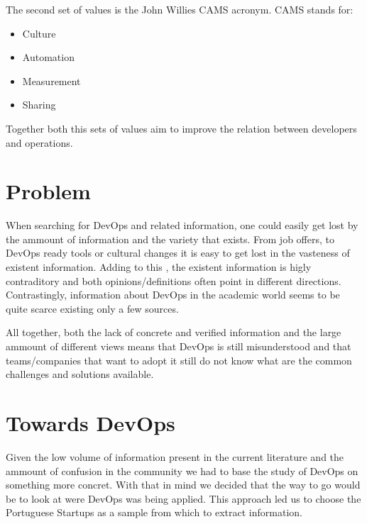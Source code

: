 \documentclass[runningheads,a4paper]{llncs}
\begin{document}
The second set of values is the John Willies CAMS acronym. CAMS stands for:
	\begin{itemize}
	\item Culture
	\item Automation
	\item Measurement
	\item Sharing 
	\end{itemize}
Together both this sets of values aim to improve the relation between developers and operations.


\section{Problem}

When searching for DevOps and related information, one could easily get lost by the ammount of information and the variety that exists. From job offers, to DevOps ready tools or cultural changes it is easy to get lost in the vasteness of existent information. Adding to this , the existent information is higly contraditory and both opinions/definitions often point in different directions. Contrastingly, information about DevOps in the academic world seems to be quite scarce existing only a few sources. 

All together, both the lack of concrete and verified information and the large ammount of different views means that DevOps is still misunderstood and that teams/companies that want to adopt it still do not know what are the common challenges and solutions available.


\section{Towards DevOps}

Given the low volume of information present in the current literature and the ammount of confusion in the community we had to base the study of DevOps on something more concret. With that in mind we decided that the way to go would be to look at were DevOps was being applied. This approach led us to choose the Portuguese Startups as a sample from which to extract information.
\end{document}
